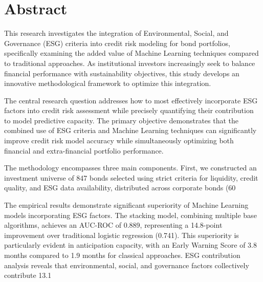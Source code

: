 \chapter*{Abstract}

This research investigates the integration of Environmental, Social, and Governance (ESG) criteria into credit risk modeling for bond portfolios, specifically examining the added value of Machine Learning techniques compared to traditional approaches. As institutional investors increasingly seek to balance financial performance with sustainability objectives, this study develops an innovative methodological framework to optimize this integration.

The central research question addresses how to most effectively incorporate ESG factors into credit risk assessment while precisely quantifying their contribution to model predictive capacity. The primary objective demonstrates that the combined use of ESG criteria and Machine Learning techniques can significantly improve credit risk model accuracy while simultaneously optimizing both financial and extra-financial portfolio performance.

The methodology encompasses three main components. First, we constructed an investment universe of 847 bonds selected using strict criteria for liquidity, credit quality, and ESG data availability, distributed across corporate bonds (60%

The empirical results demonstrate significant superiority of Machine Learning models incorporating ESG factors. The stacking model, combining multiple base algorithms, achieves an AUC-ROC of 0.889, representing a 14.8-point improvement over traditional logistic regression (0.741). This superiority is particularly evident in anticipation capacity, with an Early Warning Score of 3.8 months compared to 1.9 months for classical approaches. ESG contribution analysis reveals that environmental, social, and governance factors collectively contribute 13.1%


